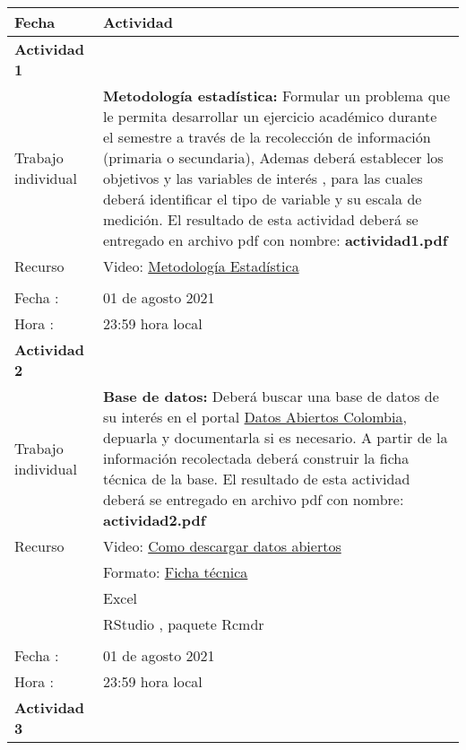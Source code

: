 \documentclass[base=hide,11pt]{elegantbook}
\begin{document}
\begin{tabular}{p{4cm}p{10cm}}
\hline	
Fecha                   & Actividad	\\
\hline 	
{\bf Actividad 1}            &\\
Trabajo individual     & \textcolor{col3}{\bf Metodología estadística:} Formular un  problema que le permita  desarrollar un  ejercicio académico durante  el  semestre a través de  la recolección  de información (primaria o secundaria), Ademas deberá establecer los  objetivos y las  variables de  interés , para las  cuales  deberá  identificar el tipo de  variable  y su  escala  de medición.  El resultado  de esta actividad deberá se entregado  en archivo pdf con  nombre: {\bf actividad1.pdf}  \\
Recurso & Video: \href{URL}{Metodología Estadística}\\
&\\
Fecha  : & 01 de agosto 2021\\
Hora   : & 23:59 hora local \\
\hline 
{\bf Actividad 2}  & \\
Trabajo individual &  \textcolor{col3}{\bf Base de datos:} Deberá  buscar una  base de  datos  de su interés  en el  portal  \href{https://www.datos.gov.co/}{Datos Abiertos Colombia},  depuarla  y  documentarla  si es  necesario. A partir de la información  recolectada deberá construir la ficha técnica de  la base. El resultado  de esta actividad deberá se entregado  en archivo pdf con  nombre: {\bf actividad2.pdf} \\
Recurso & Video: \href{https://www.youtube.com/watch?v=lRftK2mL3Sw}{Como descargar datos abiertos}\\
&Formato:  \href{https://drive.google.com/file/d/1O1eaS8y6olf5o_42ehgDgVZ4q1dganbd/view?usp=sharing}{Ficha técnica}\\
& Excel \\
& RStudio , paquete Rcmdr \\
&\\
Fecha  : & 01 de agosto  2021\\
Hora   : & 23:59 hora local \\
\hline 
{\bf Actividad 3}  &\\ 

\end{tabular}
\end{document}
